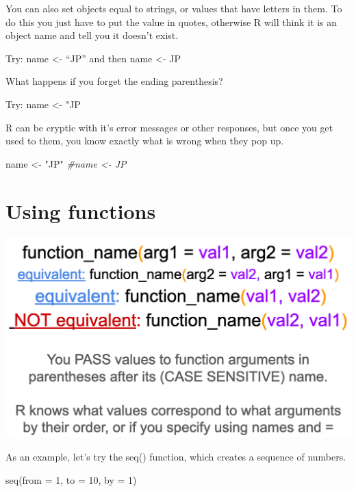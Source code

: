 \documentclass[
]{book}
\newenvironment{Shaded}{\begin{snugshade}}{\end{snugshade}}
\newcommand{\AttributeTok}[1]{\textcolor[rgb]{0.77,0.63,0.00}{#1}}
\newcommand{\CommentTok}[1]{\textcolor[rgb]{0.56,0.35,0.01}{\textit{#1}}}
\newcommand{\DecValTok}[1]{\textcolor[rgb]{0.00,0.00,0.81}{#1}}
\newcommand{\FunctionTok}[1]{\textcolor[rgb]{0.00,0.00,0.00}{#1}}
\newcommand{\NormalTok}[1]{#1}
\newcommand{\OtherTok}[1]{\textcolor[rgb]{0.56,0.35,0.01}{#1}}
\newcommand{\StringTok}[1]{\textcolor[rgb]{0.31,0.60,0.02}{#1}}
\begin{document}
You can also set objects equal to strings, or values that have letters in them. To do this you just have to put the value in quotes, otherwise R will think it is an object name and tell you it doesn't exist.

Try: name \textless- ``JP'' and then name \textless- JP

What happens if you forget the ending parenthesis?

Try: name \textless- "JP

R can be cryptic with it's error messages or other responses, but once you get used to them, you know exactly what is wrong when they pop up.

\begin{Shaded}
\begin{Highlighting}[]
\NormalTok{name }\OtherTok{\textless{}{-}} \StringTok{"JP"}
\CommentTok{\#name \textless{}{-} JP}
\end{Highlighting}
\end{Shaded}

\hypertarget{using-functions}{%
\section{Using functions}\label{using-functions}}

\includegraphics{images/Function syntax.png}

As an example, let's try the seq() function, which creates a sequence of numbers.

\begin{Shaded}
\begin{Highlighting}[]
\FunctionTok{seq}\NormalTok{(}\AttributeTok{from =} \DecValTok{1}\NormalTok{, }\AttributeTok{to =} \DecValTok{10}\NormalTok{, }\AttributeTok{by =} \DecValTok{1}\NormalTok{)}
\end{Highlighting}
\end{Shaded}
\end{document}
